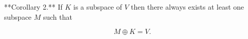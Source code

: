 **Corollary 2.** If $K$ is a subspace of $V$ then there always exists at least one subspace $M$ such that

$$M \oplus K = V.$$
